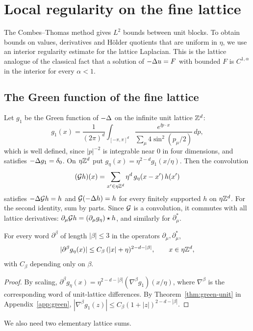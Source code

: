 \section{Local regularity on the fine lattice}\label{sec:regularity}

The Combes--Thomas method gives $L^2$ bounds between unit blocks. To obtain bounds on values, derivatives and H\"older quotients that are uniform in $\eta$, we use an interior regularity estimate for the lattice Laplacian. This is the lattice analogue of the classical fact that a solution of $-\Delta u=F$ with bounded $F$ is $C^{1,\alpha}$ in the interior for every $\alpha<1$.

\subsection{The Green function of the fine lattice}\label{ss:6.1}

Let $g_1$ be the Green function of $-\Delta$ on the infinite unit lattice $\mathbb Z^d$:
\[
g_1(x)=\frac1{(2\pi)^d}\int_{[-\pi,\pi]^d}\frac{e^{\ii p\cdot x}}{\sum_\mu4\sin^2(p_\mu/2)}\,dp ,
\]
which is well defined, since $|p|^{-2}$ is integrable near $0$ in four dimensions, and satisfies $-\Delta g_1=\delta_0$. On $\eta\mathbb Z^d$ put $g_\eta(x)=\eta^{2-d}g_1(x/\eta)$. Then the convolution
\[
(\mathcal G h)(x)=\sum_{x'\in\eta\mathbb Z^d}\eta^d\,g_\eta(x-x')\,h(x')
\]
satisfies $-\Delta\mathcal G h=h$ and $\mathcal G(-\Delta h)=h$ for every finitely supported $h$ on $\eta\mathbb Z^d$. For the second identity, sum by parts. Since $\mathcal G$ is a convolution, it commutes with all lattice derivatives: $\partial_\mu\mathcal G h=(\partial_\mu g_\eta)\star h$, and similarly for $\partial^*_\mu$.

\begin{proposition}\label{prop:green-eta}
For every word $\partial^\beta$ of length $|\beta|\le3$ in the operators $\partial_\mu,\partial^*_\mu$,
\[
|\partial^\beta g_\eta(x)|\le C_\beta\,(|x|+\eta)^{2-d-|\beta|},\qquad x\in\eta\mathbb Z^d,
\]
with $C_\beta$ depending only on $\beta$.
\end{proposition}

\begin{proof}
By scaling, $\partial^\beta g_\eta(x)=\eta^{2-d-|\beta|}(\nabla^\beta g_1)(x/\eta)$, where $\nabla^\beta$ is the corresponding word of unit-lattice differences. By Theorem~\ref{thm:green-unit} in Appendix~\ref{app:green}, $|\nabla^\beta g_1(z)|\le C_\beta(1+|z|)^{2-d-|\beta|}$.
\end{proof}

We also need two elementary lattice sums.

